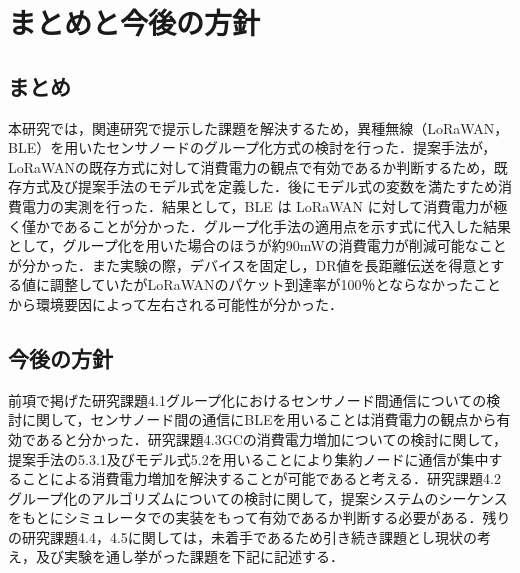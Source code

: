 \chapter{まとめと今後の方針}
\section{まとめ}
本研究では，関連研究で提示した課題を解決するため，異種無線（LoRaWAN，BLE）を用いたセンサノードのグループ化方式の検討を行った．提案手法が，LoRaWANの既存方式に対して消費電力の観点で有効であるか判断するため，既存方式及び提案手法のモデル式を定義した．後にモデル式の変数を満たすため消費電力の実測を行った．結果として，BLE は LoRaWAN に対して消費電力が極く僅かであることが分かった．グループ化手法の適用点を示す式に代入した結果として，グループ化を用いた場合のほうが約90mWの消費電力が削減可能なことが分かった．また実験の際，デバイスを固定し，DR値を長距離伝送を得意とする値に調整していたがLoRaWANのパケット到達率が100％とならなかったことから環境要因によって左右される可能性が分かった．
\par

\section{今後の方針}
前項で掲げた研究課題4.1グループ化におけるセンサノード間通信についての検討に関して，センサノード間の通信にBLEを用いることは消費電力の観点から有効であると分かった．研究課題4.3GCの消費電力増加についての検討に関して，提案手法の5.3.1及びモデル式5.2を用いることにより集約ノードに通信が集中することによる消費電力増加を解決することが可能であると考える．研究課題4.2グループ化のアルゴリズムについての検討に関して，提案システムのシーケンスをもとにシミュレータでの実装をもって有効であるか判断する必要がある．残りの研究課題4.4，4.5に関しては，未着手であるため引き続き課題とし現状の考え，及び実験を通し挙がった課題を下記に記述する．


